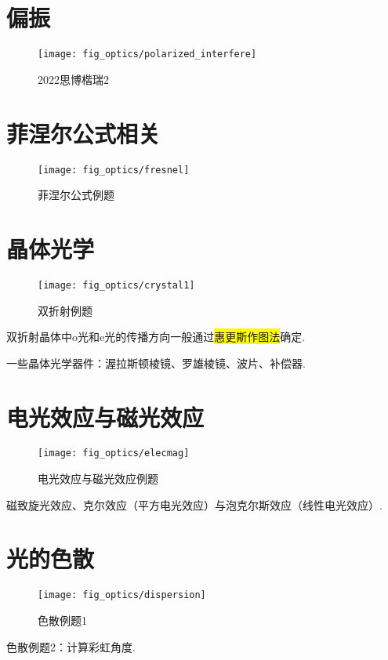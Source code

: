 \documentclass[a4paper]{article}
\begin{document}
	\section{偏振}
	\begin{figure}[H]
		\centering
		\texttt{[image: fig\_optics/polarized\_interfere]}
		\caption{2022思博楷瑞2}
		\label{fig:polarizedinterfere}
	\end{figure}
	
	\section{菲涅尔公式相关}
	\begin{framed}
	\begin{figure}[H]
		\centering
		\texttt{[image: fig\_optics/fresnel]}
		\caption{菲涅尔公式例题}
		\label{fig:fresnel}
	\end{figure}
	\end{framed}
	
	\section{晶体光学}
	\begin{framed}
		\begin{figure}[H]
			\centering
			\texttt{[image: fig\_optics/crystal1]}
			\caption{双折射例题}
			\label{fig:crystal1}
		\end{figure}
	\end{framed}
	
	双折射晶体中o光和e光的传播方向一般通过\colorbox{yellow}{惠更斯作图法}确定.
	
	一些晶体光学器件：渥拉斯顿棱镜、罗雄棱镜、波片、补偿器.
	
	\section{电光效应与磁光效应}
	\begin{framed}
	
	\begin{figure}[H]
		\centering
		\texttt{[image: fig\_optics/elecmag]}
		\caption{电光效应与磁光效应例题}
		\label{fig:elecmag}
	\end{figure}
	\end{framed}
	
	磁致旋光效应、克尔效应（平方电光效应）与泡克尔斯效应（线性电光效应）.
	
	\section{光的色散}
	\begin{framed}
		\begin{figure}[H]
			\centering
			\texttt{[image: fig\_optics/dispersion]}
			\caption{色散例题1}
			\label{fig:dispersion}
		\end{figure}
		
		色散例题2：计算彩虹角度.
	\end{framed}
	
\end{document}
